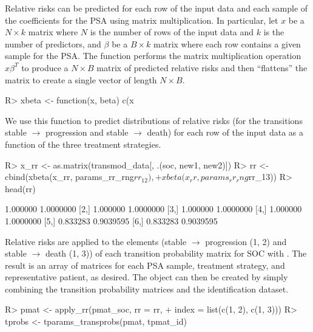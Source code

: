 \documentclass[article, nojss]{jss}\usepackage[]{graphicx}\usepackage[]{color}
\begin{document}
Relative risks can be predicted for each row of the input data and each sample of the coefficients for the PSA using matrix multiplication. In particular, let $x$ be a $N \times k$ matrix where $N$ is the number of rows of the input data and $k$ is the number of predictors, and $\beta$ be a $B \times k$ matrix where each row contains a given sample for the PSA. The function  performs the matrix multiplication operation $x\beta^T$ to produce a $N \times B$ matrix of predicted relative risks and then ``flattens'' the matrix to create a single vector of length $N \times B$.

\begin{Schunk}
\begin{Sinput}
R> xbeta <- function(x, beta) c(x %
\end{Sinput}
\end{Schunk}

We use this function to predict distributions of relative risks (for the transitions stable $\rightarrow$ progression and stable $\rightarrow$ death) for each row of the input data as a function of the three treatment strategies. 

\begin{Schunk}
\begin{Sinput}
R> x_rr <- as.matrix(transmod_data[, .(soc, new1, new2)])
R> rr <- cbind(xbeta(x_rr, params_rr_rng$rr_12),
+              xbeta(x_rr, params_rr_rng$rr_13))
R> head(rr) 
\end{Sinput}
\begin{Soutput}
         [,1]      [,2]
[1,] 1.000000 1.0000000
[2,] 1.000000 1.0000000
[3,] 1.000000 1.0000000
[4,] 1.000000 1.0000000
[5,] 0.833283 0.9039595
[6,] 0.833283 0.9039595
\end{Soutput}
\end{Schunk}

Relative risks are applied to the elements (stable $\rightarrow$ progression (1, 2) and stable $\rightarrow$ death (1, 3)) of each transition probability matrix for SOC with . The result is an array of matrices for each PSA sample, treatment strategy,  and representative patient, as desired. The  object can then be created by simply combining the transition probability matrices and the identification dataset. 

\begin{Schunk}
\begin{Sinput}
R> pmat <- apply_rr(pmat_soc, rr = rr,
+                   index = list(c(1, 2), c(1, 3)))
R> tprobs <- tparams_transprobs(pmat, tpmat_id)
\end{Sinput}
\end{Schunk}
\end{document}
